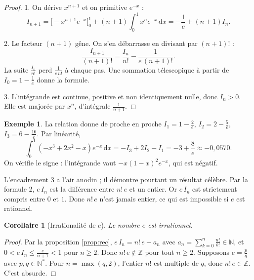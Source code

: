 \documentclass[11pt,a4paper]{article}
\theoremstyle{plain}
\newtheorem{corollaire}[theoreme]{Corollaire}
\theoremstyle{definition}
\newtheorem{exemple}[theoreme]{Exemple}
\theoremstyle{remark}
\newcommand{\N}{\mathbb{N}}
\newcommand{\Z}{\mathbb{Z}}
\newcommand{\dd}{\,\mathrm{d}}
\begin{document}
\begin{proof}
1. On dérive $x^{n+1}$ et on primitive $e^{-x}$ :
\[
  I_{n+1}=\big[-x^{n+1}e^{-x}\big]_0^1+(n+1)\int_0^1x^ne^{-x}\dd x=-\frac1e+(n+1)I_n .
\]

2. Le facteur $(n+1)$ gêne. On s'en débarrasse en divisant par $(n+1)!$ :
\[
  \frac{I_{n+1}}{(n+1)!}=\frac{I_n}{n!}-\frac1{e\,(n+1)!}.
\]
La suite $\frac{I_n}{n!}$ perd $\frac{1}{e\,n!}$ à chaque pas. Une sommation télescopique à partir de $I_0=1-\frac1e$ donne la formule.

3. L'intégrande est continue, positive et non identiquement nulle, donc $I_n>0$. Elle est majorée par $x^n$, d'intégrale $\frac1{n+1}$.
\end{proof}

\begin{exemple}
La relation donne de proche en proche $I_1=1-\frac2e$, $I_2=2-\frac5e$, $I_3=6-\frac{16}e$. Par linéarité,
\[
  \int_0^1(-x^3+2x^2-x)e^{-x}\dd x=-I_3+2I_2-I_1=-3+\frac8e\approx-0{,}0570 .
\]
On vérifie le signe : l'intégrande vaut $-x(1-x)^2e^{-x}$, qui est négatif.
\end{exemple}

L'encadrement 3 a l'air anodin ; il démontre pourtant un résultat célèbre. Par la formule 2, $e\,I_n$ est la différence entre $n!\,e$ et un entier. Or $e\,I_n$ est strictement compris entre $0$ et $1$. Donc $n!\,e$ n'est jamais entier, ce qui est impossible si $e$ est rationnel.

\begin{corollaire}[Irrationalité de $e$]\label{cor:e-irr}
Le nombre $e$ est irrationnel.
\end{corollaire}

\begin{proof}
Par la proposition \ref{prop:rec}, $e\,I_n=n!\,e-a_n$ avec $a_n=\sum_{k=0}^n\frac{n!}{k!}\in\N$, et $0<e\,I_n\leq\frac{e}{n+1}<1$ pour $n\geq2$. Donc $n!\,e\notin\Z$ pour tout $n\geq2$. Supposons $e=\frac pq$ avec $p,q\in\N^*$. Pour $n=\max(q,2)$, l'entier $n!$ est multiple de $q$, donc $n!\,e\in\Z$. C'est absurde.
\end{proof}
\end{document}

